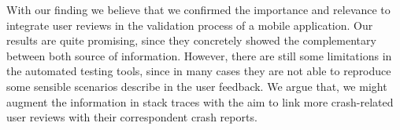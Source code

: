 With our finding we believe that we confirmed the importance and relevance to integrate user reviews in the validation process of a mobile application. 
Our results are quite promising, since they concretely showed the complementary between both source of information. 
However, there are still some limitations in the automated testing tools, since in many cases they are not able to reproduce some sensible scenarios describe in the user feedback. 
We argue that, we might augment the information in stack traces with the aim to link more crash-related user reviews with their correspondent crash reports. 


